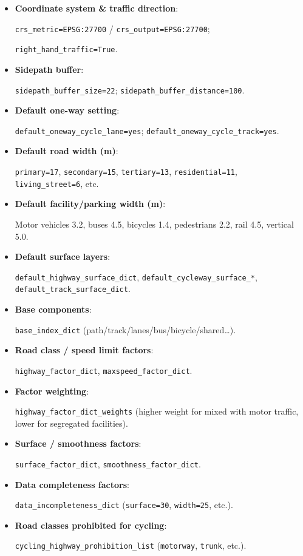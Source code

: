 \documentclass[
  12pt,
  oneside]{book}
\begin{document}
\begin{itemize}
\item
  \textbf{Coordinate system \& traffic direction}:

  \texttt{crs\_metric=\textquotesingle{}EPSG:27700\textquotesingle{}} / \texttt{crs\_output=\textquotesingle{}EPSG:27700\textquotesingle{}};

  \texttt{right\_hand\_traffic=True}.
\item
  \textbf{Sidepath buffer}:

  \texttt{sidepath\_buffer\_size=22}; \texttt{sidepath\_buffer\_distance=100}.
\item
  \textbf{Default one-way setting}:

  \texttt{default\_oneway\_cycle\_lane=\textquotesingle{}yes\textquotesingle{}}; \texttt{default\_oneway\_cycle\_track=\textquotesingle{}yes\textquotesingle{}}.
\item
  \textbf{Default road width (m)}:

  \texttt{primary=17}, \texttt{secondary=15}, \texttt{tertiary=13}, \texttt{residential=11}, \texttt{living\_street=6}, etc.
\item
  \textbf{Default facility/parking width (m)}:

  Motor vehicles 3.2, buses 4.5, bicycles 1.4, pedestrians 2.2, rail 4.5, vertical 5.0.
\item
  \textbf{Default surface layers}:

  \texttt{default\_highway\_surface\_dict}, \texttt{default\_cycleway\_surface\_*}, \texttt{default\_track\_surface\_dict}.
\item
  \textbf{Base components}:

  \texttt{base\_index\_dict} (path/track/lanes/bus/bicycle/shared\ldots).
\item
  \textbf{Road class / speed limit factors}:

  \texttt{highway\_factor\_dict}, \texttt{maxspeed\_factor\_dict}.
\item
  \textbf{Factor weighting}:

  \texttt{highway\_factor\_dict\_weights} (higher weight for mixed with motor traffic, lower for segregated facilities).
\item
  \textbf{Surface / smoothness factors}:

  \texttt{surface\_factor\_dict}, \texttt{smoothness\_factor\_dict}.
\item
  \textbf{Data completeness factors}:

  \texttt{data\_incompleteness\_dict} (\texttt{surface=30}, \texttt{width=25}, etc.).
\item
  \textbf{Road classes prohibited for cycling}:

  \texttt{cycling\_highway\_prohibition\_list} (\texttt{motorway}, \texttt{trunk}, etc.).
\end{itemize}
\end{document}
